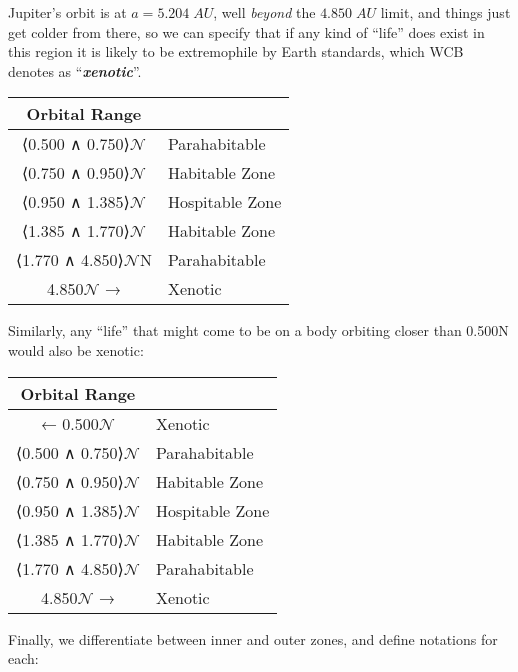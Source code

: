 \documentclass[
  letterpaper,
]{book}
\begin{document}
Jupiter's orbit is at \(a = 5.204\;AU\), well \emph{beyond} the
\(4.850\;AU\) limit, and things just get colder from there, so we can
specify that if any kind of ``life'' does exist in this region it is
likely to be extremophile by Earth standards, which WCB denotes as
``\textbf{\emph{xenotic}}''.

\begin{longtable}[]{@{}cl@{}}
\toprule\noalign{}
Orbital Range & \\
\midrule\noalign{}
\endhead
\bottomrule\noalign{}
\endlastfoot
⟨0.500 ∧ 0.750⟩\(\mathcal{N}\) & Parahabitable \\
⟨0.750 ∧ 0.950⟩\(\mathcal{N}\) & Habitable Zone \\
⟨0.950 ∧ 1.385⟩\(\mathcal{N}\) & Hospitable Zone \\
⟨1.385 ∧ 1.770⟩\(\mathcal{N}\) & Habitable Zone \\
⟨1.770 ∧ 4.850⟩\(\mathcal{N}\)N & Parahabitable \\
4.850\(\mathcal{N}\) → & Xenotic \\
\end{longtable}

Similarly, any ``life'' that might come to be on a body orbiting closer
than 0.500N would also be xenotic:

\begin{longtable}[]{@{}cl@{}}
\toprule\noalign{}
Orbital Range & \\
\midrule\noalign{}
\endhead
\bottomrule\noalign{}
\endlastfoot
← 0.500\(\mathcal{N}\) & Xenotic \\
⟨0.500 ∧ 0.750⟩\(\mathcal{N}\) & Parahabitable \\
⟨0.750 ∧ 0.950⟩\(\mathcal{N}\) & Habitable Zone \\
⟨0.950 ∧ 1.385⟩\(\mathcal{N}\) & Hospitable Zone \\
⟨1.385 ∧ 1.770⟩\(\mathcal{N}\) & Habitable Zone \\
⟨1.770 ∧ 4.850⟩\(\mathcal{N}\) & Parahabitable \\
4.850\(\mathcal{N}\) → & Xenotic \\
\end{longtable}

Finally, we differentiate between inner and outer zones, and define
notations for each:
\end{document}
